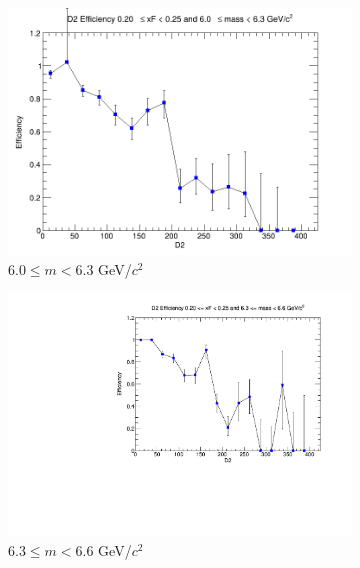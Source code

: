 \documentclass[11pt]{article}
\begin{document}
\begin{figure}[p]
\begin{subfigure}[b]{0.32\textwidth}
        \includegraphics[width=\textwidth]{./kTrackerEfficiencyPlots/D2_Efficiency_xF4_mass6.png}
        \caption{$6.0 \leq m < 6.3$ GeV/$c^2$}
    \end{subfigure}\hfill
    \begin{subfigure}[b]{0.32\textwidth}
        \centering
        \includegraphics[width=\textwidth]{./kTrackerEfficiencyPlots/D2_Efficiency_xF4_mass7.pdf}
        \caption{$6.3 \leq m < 6.6$ GeV/$c^2$}
    \end{subfigure}\hfill
    \begin{subfigure}[b]{0.32\textwidth}
        \centering

\end{subfigure}
\end{figure}
\end{document}
